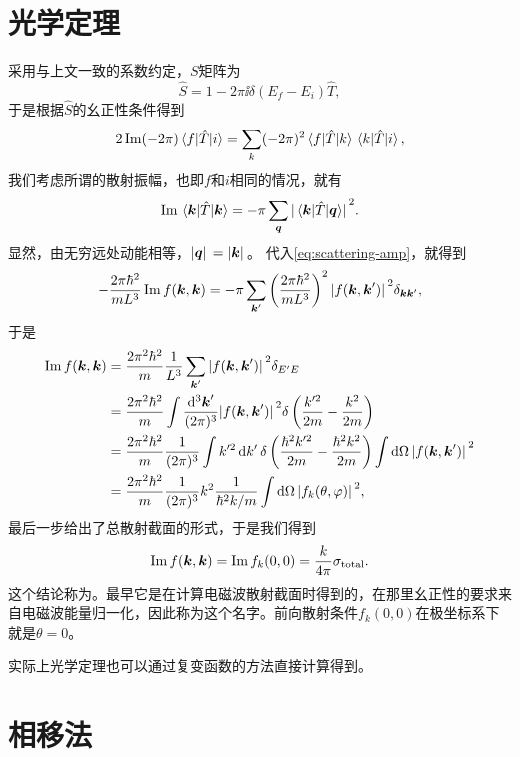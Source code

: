 \section{光学定理}

采用与上文一致的系数约定，$S$矩阵为
\[
    \hat{S} = 1 - 2 \pi \ii \delta(E_f - E_i) \hat{T},
\]
于是根据$\hat{S}$的幺正性条件得到
\[
    2 \Im (- 2 \pi) \mel*{f}{\hat{T}}{i} = \sum_k (- 2 \pi)^2 \mel*{f}{\hat{T}}{k} \mel*{k}{\hat{T}}{i},
\]
我们考虑所谓的散射振幅，也即$f$和$i$相同的情况，就有
\[
    \Im \mel*{\vb*{k}}{\hat{T}}{\vb*{k}} = - \pi \sum_{\vb*{q}} \abs*{\mel*{\vb*{k}}{\hat{T}}{\vb*{q}}}^2.
\]
显然，由无穷远处动能相等，$\abs*{\vb*{q}} = \abs*{\vb*{k}}$。
代入\eqref{eq:scattering-amp}，就得到
\[
    - \frac{2 \pi \hbar^2}{m L^3} \Im f(\vb*{k}, \vb*{k}) = - \pi \sum_{\vb*{k}'} \left( \frac{2 \pi \hbar^2}{m L^3} \right)^2 \abs*{f(\vb*{k}, \vb*{k}')}^2 \delta_{\vb*{k} \vb*{k}'},
\]
于是
\[
    \begin{aligned}
        \Im f(\vb*{k}, \vb*{k}) &= \frac{2\pi^2 \hbar^2}{m} \frac{1}{L^3} \sum_{\vb*{k}'} \abs*{f(\vb*{k}, \vb*{k}')}^2 \delta_{E' E} \\
        &= \frac{2\pi^2 \hbar^2}{m} \int \frac{\dd[3]{\vb*{k}'}}{(2\pi)^3} \abs*{f(\vb*{k}, \vb*{k}')}^2 \delta\left(\frac{k'^2}{2m} - \frac{k^2}{2m}\right) \\
        &= \frac{2\pi^2 \hbar^2}{m} \frac{1}{(2\pi)^3} \int k'^2 \dd{k'} \delta\left(\frac{\hbar^2 k'^2}{2m} - \frac{\hbar^2 k^2}{2m}\right) \int \dd{\Omega} \abs*{f(\vb*{k}, \vb*{k}')}^2 \\
        &= \frac{2\pi^2 \hbar^2}{m} \frac{1}{(2\pi)^3} k^2 \frac{1}{\hbar^2 k / m} \int \dd{\Omega} \abs*{f_k(\theta, \varphi)}^2 ,
    \end{aligned}
\]
最后一步给出了总散射截面的形式，于是我们得到
\begin{equation}
    \Im f(\vb*{k}, \vb*{k}) = \Im f_k(0, 0) = \frac{k}{4\pi} \sigma_\text{total}.
\end{equation}
这个结论称为。最早它是在计算电磁波散射截面时得到的，在那里幺正性的要求来自电磁波能量归一化，因此称为这个名字。前向散射条件$f_k(0, 0)$在极坐标系下就是$\theta=0$。

实际上光学定理也可以通过复变函数的方法直接计算得到。

\section{相移法}

